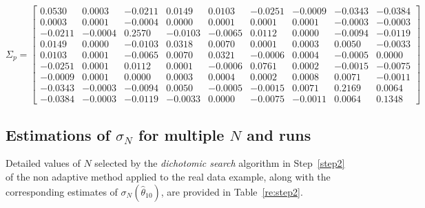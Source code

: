 \documentclass[pdflatex,sn-mathphys-num]{sn-jnl}
\theoremstyle{thmstyleone}
\theoremstyle{thmstyletwo}
\theoremstyle{thmstylethree}
\begin{document}
\begin{equation*}
\Sigma_p = 
\begin{bmatrix}
  0.0530  &  0.0003  & -0.0211  &  0.0149  &  0.0103  & -0.0251  & -0.0009  & -0.0343  & -0.0384 \\ 
  0.0003  &  0.0001  & -0.0004  &  0.0000  &  0.0001  &  0.0001  &  0.0001  & -0.0003  & -0.0003 \\
 -0.0211  & -0.0004  & {0.2570}  & -0.0103  & -0.0065  &  0.0112  &  0.0000  & -0.0094  & -0.0119 \\
  0.0149  &  0.0000  & -0.0103  &  0.0318  &  0.0070  &  0.0001  &  0.0003  &  0.0050  & -0.0033 \\
  0.0103  &  0.0001  & -0.0065  &  0.0070  &  0.0321  & -0.0006  &  0.0004  & -0.0005  &  0.0000 \\
 -0.0251  &  0.0001  &  0.0112  &  0.0001  & -0.0006  &  0.0761  &  0.0002  & -0.0015  & -0.0075 \\
 -0.0009  &  0.0001  &  0.0000  &  0.0003  &  0.0004  &  0.0002  &  0.0008  &  0.0071  & -0.0011 \\
 -0.0343  & -0.0003  & -0.0094  &  0.0050  & -0.0005  & -0.0015  &  0.0071  & {0.2169}  &  0.0064 \\
 -0.0384  & -0.0003  & -0.0119  & -0.0033  &  0.0000  & -0.0075  & -0.0011  &  0.0064  & {0.1348}
\end{bmatrix}
\end{equation*}

\subsection{Estimations of \(\sigma_N\) for multiple \(N\) and runs}
\label{appendixE3}
 Detailed values of \( N \) selected by the \textit{dichotomic search} algorithm in Step~\ref{step2} of the non adaptive method applied to the real data example, along with the corresponding estimates of \( \sigma_N(\hat\theta_{10}) \), are provided in Table~\ref{re:step2}.
 
\end{document}
